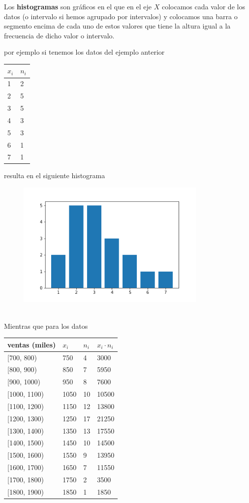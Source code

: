 \documentclass[
]{article}
\begin{document}
Los \textbf{histogramas} son gráficos en el que en el eje \(X\)
colocamos cada valor de los datos (o intervalo si hemos agrupado por
intervalos) y colocamos una barra o segmento encima de cada uno de estos
valores que tiene la altura igual a la frecuencia de dicho valor o
intervalo.

por ejemplo si tenemos los datos del ejemplo anterior

\begin{longtable}[]{@{}ll@{}}
\toprule
\(x_i\) & \(n_i\)\tabularnewline
\midrule
\endhead
1 & 2\tabularnewline
2 & 5\tabularnewline
3 & 5\tabularnewline
4 & 3\tabularnewline
5 & 3\tabularnewline
6 & 1\tabularnewline
7 & 1\tabularnewline
\bottomrule
\end{longtable}

resulta en el siguiente histograma

\begin{figure}
\centering
\includegraphics[width=3.64583in,height=\textheight]{img/histograma.png}
\caption{~}
\end{figure}

Mientras que para los datos

\begin{longtable}[]{@{}llll@{}}
\toprule
ventas (miles) & \(x_i\) & \(n_i\) & \(x_i \cdot n_i\)\tabularnewline
\midrule
\endhead
{[}700, 800) & 750 & 4 & 3000\tabularnewline
{[}800, 900) & 850 & 7 & 5950\tabularnewline
{[}900, 1000) & 950 & 8 & 7600\tabularnewline
{[}1000, 1100) & 1050 & 10 & 10500\tabularnewline
{[}1100, 1200) & 1150 & 12 & 13800\tabularnewline
{[}1200, 1300) & 1250 & 17 & 21250\tabularnewline
{[}1300, 1400) & 1350 & 13 & 17550\tabularnewline
{[}1400, 1500) & 1450 & 10 & 14500\tabularnewline
{[}1500, 1600) & 1550 & 9 & 13950\tabularnewline
{[}1600, 1700) & 1650 & 7 & 11550\tabularnewline
{[}1700, 1800) & 1750 & 2 & 3500\tabularnewline
{[}1800, 1900) & 1850 & 1 & 1850\tabularnewline
\bottomrule
\end{longtable}
\end{document}
